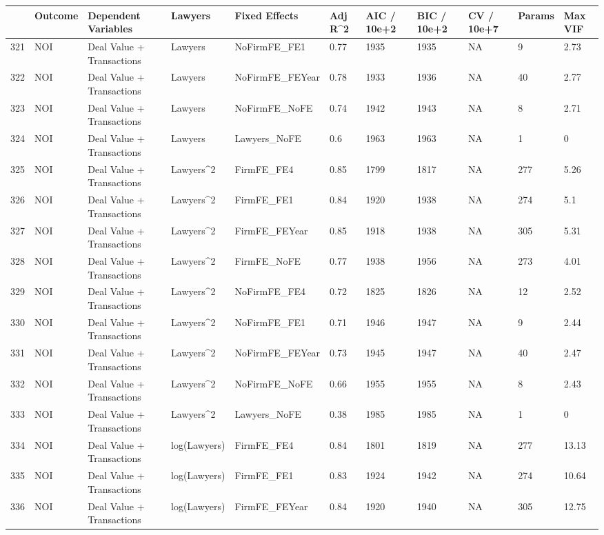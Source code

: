 \documentclass{article}
\begin{document}
\begin{table}[H]
\centering
\begin{tabular}{rllllllllll}
  \hline
 & Outcome & Dependent Variables & Lawyers & Fixed Effects & Adj R^2 & AIC / 10e+2 & BIC / 10e+2 & CV / 10e+7 & Params & Max VIF \\
  \hline
321 & NOI & Deal Value + Transactions & Lawyers & NoFirmFE\_FE1 & 0.77 & 1935 & 1935 & NA & 9 & 2.73 \\
  322 & NOI & Deal Value + Transactions & Lawyers & NoFirmFE\_FEYear & 0.78 & 1933 & 1936 & NA & 40 & 2.77 \\
  323 & NOI & Deal Value + Transactions & Lawyers & NoFirmFE\_NoFE & 0.74 & 1942 & 1943 & NA & 8 & 2.71 \\
  324 & NOI & Deal Value + Transactions & Lawyers & Lawyers\_NoFE & 0.6 & 1963 & 1963 & NA & 1 & 0 \\
  325 & NOI & Deal Value + Transactions & Lawyers^2 & FirmFE\_FE4 & 0.85 & 1799 & 1817 & NA & 277 & 5.26 \\
  326 & NOI & Deal Value + Transactions & Lawyers^2 & FirmFE\_FE1 & 0.84 & 1920 & 1938 & NA & 274 & 5.1 \\
  327 & NOI & Deal Value + Transactions & Lawyers^2 & FirmFE\_FEYear & 0.85 & 1918 & 1938 & NA & 305 & 5.31 \\
  328 & NOI & Deal Value + Transactions & Lawyers^2 & FirmFE\_NoFE & 0.77 & 1938 & 1956 & NA & 273 & 4.01 \\
  329 & NOI & Deal Value + Transactions & Lawyers^2 & NoFirmFE\_FE4 & 0.72 & 1825 & 1826 & NA & 12 & 2.52 \\
  330 & NOI & Deal Value + Transactions & Lawyers^2 & NoFirmFE\_FE1 & 0.71 & 1946 & 1947 & NA & 9 & 2.44 \\
  331 & NOI & Deal Value + Transactions & Lawyers^2 & NoFirmFE\_FEYear & 0.73 & 1945 & 1947 & NA & 40 & 2.47 \\
  332 & NOI & Deal Value + Transactions & Lawyers^2 & NoFirmFE\_NoFE & 0.66 & 1955 & 1955 & NA & 8 & 2.43 \\
  333 & NOI & Deal Value + Transactions & Lawyers^2 & Lawyers\_NoFE & 0.38 & 1985 & 1985 & NA & 1 & 0 \\
  334 & NOI & Deal Value + Transactions & log(Lawyers) & FirmFE\_FE4 & 0.84 & 1801 & 1819 & NA & 277 & 13.13 \\
  335 & NOI & Deal Value + Transactions & log(Lawyers) & FirmFE\_FE1 & 0.83 & 1924 & 1942 & NA & 274 & 10.64 \\
  336 & NOI & Deal Value + Transactions & log(Lawyers) & FirmFE\_FEYear & 0.84 & 1920 & 1940 & NA & 305 & 12.75 \\

\end{tabular}
\end{table}
\end{document}
